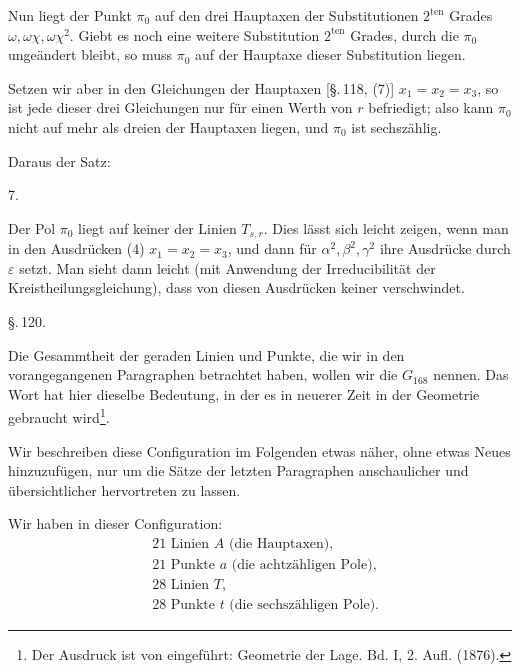 Nun liegt der Punkt $\pi_0$ auf den drei Hauptaxen der Substitutionen $2^{\mathrm{ten}}$ Grades $\omega, \omega\chi, \omega\chi^2$. Giebt es noch eine weitere Substitution $2^{\mathrm{ten}}$ Grades, durch die $\pi_0$ ungeändert bleibt, so muss $\pi_0$ auf der Hauptaxe dieser Substitution liegen.

Setzen wir aber in den Gleichungen der Hauptaxen [\S.\,118, (7)] $x_1 = x_2 = x_3$, so ist jede dieser drei Gleichungen nur für einen Werth von $r$ befriedigt; also kann $\pi_0$ nicht auf mehr als dreien der Hauptaxen liegen, und $\pi_0$ ist sechszählig.

Daraus der Satz:

7. 

Der Pol $\pi_0$ liegt auf keiner der Linien $T_{s,r}$. Dies lässt sich leicht zeigen, wenn man in den Ausdrücken (4) $x_1 = x_2 = x_3$, und dann für $\alpha^2, \beta^2, \gamma^2$ ihre Ausdrücke durch $\varepsilon$ setzt. Man sieht dann leicht (mit Anwendung der Irreducibilität der Kreistheilungsgleichung), dass von diesen Ausdrücken keiner verschwindet.

\S.\,120.


Die Gesammtheit der geraden Linien und Punkte, die wir in den vorangegangenen Paragraphen betrachtet haben, wollen wir die  $G_{168}$ nennen. Das Wort hat hier dieselbe Bedeutung, in der es in neuerer Zeit in der Geometrie gebraucht wird\footnote{Der Ausdruck ist von  eingeführt: \glqq{}Geometrie der Lage.\grqq{} Bd. I, 2. Aufl. (1876).}.

Wir beschreiben diese Configuration im Folgenden etwas näher, ohne etwas Neues hinzuzufügen, nur um die Sätze der letzten Paragraphen anschaulicher und übersichtlicher hervortreten zu lassen.

Wir haben in dieser Configuration:
\[
\begin{aligned}
&\text{21 Linien } A \text{ (die Hauptaxen)}, \\
&\text{21 Punkte } a \text{ (die achtzähligen Pole)}, \\
&\text{28 Linien } T, \\
&\text{28 Punkte } t \text{ (die sechszähligen Pole)}.
\end{aligned}
\]
